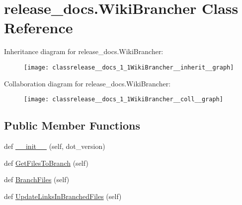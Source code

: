 \hypertarget{classrelease__docs_1_1WikiBrancher}{}\section{release\+\_\+docs.\+Wiki\+Brancher Class Reference}
\label{classrelease__docs_1_1WikiBrancher}


Inheritance diagram for release\+\_\+docs.\+Wiki\+Brancher\+:\nopagebreak
\begin{figure}[H]
\begin{center}
\leavevmode
\texttt{[image: classrelease\_\_docs\_1\_1WikiBrancher\_\_inherit\_\_graph]}
\end{center}
\end{figure}


Collaboration diagram for release\+\_\+docs.\+Wiki\+Brancher\+:\nopagebreak
\begin{figure}[H]
\begin{center}
\leavevmode
\texttt{[image: classrelease\_\_docs\_1\_1WikiBrancher\_\_coll\_\_graph]}
\end{center}
\end{figure}
\subsection*{Public Member Functions}
\begin{DoxyCompactItemize}
\item 
def \hyperlink{classrelease__docs_1_1WikiBrancher_a344b32e2b65f0e8bab9fbf1e670d33fd}{\+\_\+\+\_\+init\+\_\+\+\_\+} (self, dot\+\_\+version)
\item 
def \hyperlink{classrelease__docs_1_1WikiBrancher_a05fc4282f501fb0210ecb33fd1d209a6}{Get\+Files\+To\+Branch} (self)
\item 
def \hyperlink{classrelease__docs_1_1WikiBrancher_a5ef284f7e1742f465ecd0c14d2667327}{Branch\+Files} (self)
\item 
def \hyperlink{classrelease__docs_1_1WikiBrancher_aa0bc4b1b78426fe7a8496d570b540f1d}{Update\+Links\+In\+Branched\+Files} (self)
\end{DoxyCompactItemize}
